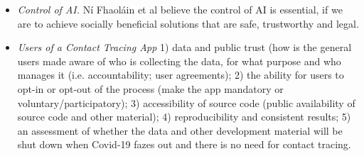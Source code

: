 \documentclass[conference]{IEEEtran}
\begin{document}
\begin{itemize}
\item {\emph{Control of AI.}}\cite{b17} Ní Fhaoláin et al  believe the control of AI is essential, if we are to achieve socially beneficial solutions that are safe, trustworthy and legal. 

\item {\emph{Users of a Contact Tracing App}} \cite{b3}
1) data and public trust (how is the general users made aware of who is collecting the data, for what purpose and who manages it (i.e. accountability; user agreements); 2) the ability for users to opt-in or opt-out of the process (make the app mandatory or voluntary/participatory); 3) accessibility of source code (public availability of source code and other material); 4) reproducibility and consistent results; 5) an assessment of whether the data and other development material will be shut down when Covid-19 fazes out and there is no need for contact tracing.


\end{itemize}
\end{document}
